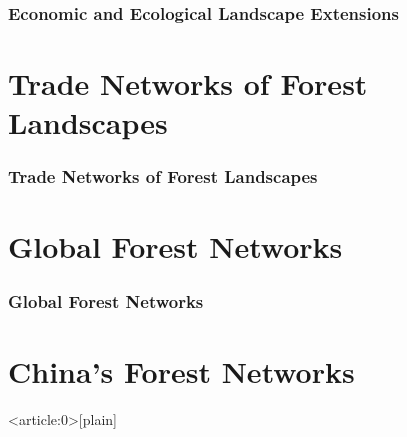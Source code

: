 \documentclass[aspectratio=169]{beamer}
\begin{document}
\begin{frame}
  \frametitle{Economic and Ecological Landscape Extensions}
\end{frame}


\section{Trade Networks of Forest Landscapes}

\begin{frame}
  \frametitle{Trade Networks of Forest Landscapes}
\end{frame}



\section{Global Forest Networks}

\begin{frame}
  \frametitle{Global Forest Networks}
\end{frame}


\section{China's Forest Networks}

{ %
    \begin{frame}<article:0>[plain]
      \frametitle{}
     \end{frame}
}
\end{document}
